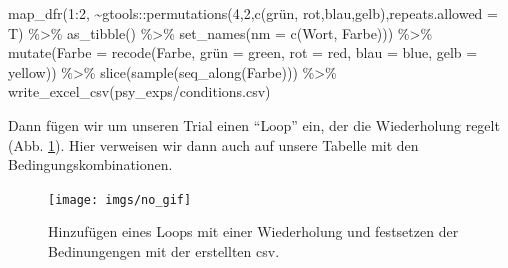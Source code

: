 \documentclass[
]{book}
\newenvironment{Shaded}{\begin{snugshade}}{\end{snugshade}}
\newcommand{\AttributeTok}[1]{\textcolor[rgb]{0.77,0.63,0.00}{#1}}
\newcommand{\DecValTok}[1]{\textcolor[rgb]{0.00,0.00,0.81}{#1}}
\newcommand{\FunctionTok}[1]{\textcolor[rgb]{0.00,0.00,0.00}{#1}}
\newcommand{\NormalTok}[1]{#1}
\newcommand{\OtherTok}[1]{\textcolor[rgb]{0.56,0.35,0.01}{#1}}
\newcommand{\SpecialCharTok}[1]{\textcolor[rgb]{0.00,0.00,0.00}{#1}}
\newcommand{\StringTok}[1]{\textcolor[rgb]{0.31,0.60,0.02}{#1}}
\begin{document}
\begin{Shaded}
\begin{Highlighting}[]
\FunctionTok{map\_dfr}\NormalTok{(}\DecValTok{1}\SpecialCharTok{:}\DecValTok{2}\NormalTok{, }\SpecialCharTok{\textasciitilde{}}\NormalTok{gtools}\SpecialCharTok{::}\FunctionTok{permutations}\NormalTok{(}\DecValTok{4}\NormalTok{,}\DecValTok{2}\NormalTok{,}\FunctionTok{c}\NormalTok{(}\StringTok{\textquotesingle{}grün\textquotesingle{}}\NormalTok{, }\StringTok{\textquotesingle{}rot\textquotesingle{}}\NormalTok{,}\StringTok{\textquotesingle{}blau\textquotesingle{}}\NormalTok{,}\StringTok{\textquotesingle{}gelb\textquotesingle{}}\NormalTok{),}\AttributeTok{repeats.allowed =}\NormalTok{ T) }\SpecialCharTok{\%\textgreater{}\%} 
    \FunctionTok{as\_tibble}\NormalTok{() }\SpecialCharTok{\%\textgreater{}\%} 
    \FunctionTok{set\_names}\NormalTok{(}\AttributeTok{nm =} \FunctionTok{c}\NormalTok{(}\StringTok{\textquotesingle{}Wort\textquotesingle{}}\NormalTok{, }\StringTok{\textquotesingle{}Farbe\textquotesingle{}}\NormalTok{))) }\SpecialCharTok{\%\textgreater{}\%} 
  \FunctionTok{mutate}\NormalTok{(}\AttributeTok{Farbe =} \FunctionTok{recode}\NormalTok{(Farbe,}
                        \StringTok{\textquotesingle{}grün\textquotesingle{}} \OtherTok{=} \StringTok{\textquotesingle{}green\textquotesingle{}}\NormalTok{, }
                        \StringTok{\textquotesingle{}rot\textquotesingle{}} \OtherTok{=} \StringTok{\textquotesingle{}red\textquotesingle{}}\NormalTok{,}
                        \StringTok{\textquotesingle{}blau\textquotesingle{}} \OtherTok{=} \StringTok{\textquotesingle{}blue\textquotesingle{}}\NormalTok{,}
                        \StringTok{\textquotesingle{}gelb\textquotesingle{}} \OtherTok{=} \StringTok{\textquotesingle{}yellow\textquotesingle{}}\NormalTok{)) }\SpecialCharTok{\%\textgreater{}\%} 
  \FunctionTok{slice}\NormalTok{(}\FunctionTok{sample}\NormalTok{(}\FunctionTok{seq\_along}\NormalTok{(Farbe))) }\SpecialCharTok{\%\textgreater{}\%} 
  \FunctionTok{write\_excel\_csv}\NormalTok{(}\StringTok{\textquotesingle{}psy\_exps/conditions.csv\textquotesingle{}}\NormalTok{)}
\end{Highlighting}
\end{Shaded}

Dann fügen wir um unseren Trial einen ``Loop'' ein, der die Wiederholung regelt (Abb. \ref{fig:step5}).
Hier verweisen wir dann auch auf unsere Tabelle mit den Bedingungskombinationen.



\begin{figure}

{\centering \texttt{[image: imgs/no\_gif]} 

}

\caption{Hinzufügen eines Loops mit einer Wiederholung und festsetzen der Bedinungengen mit der erstellten csv.}\label{fig:step5}
\end{figure}
\end{document}

